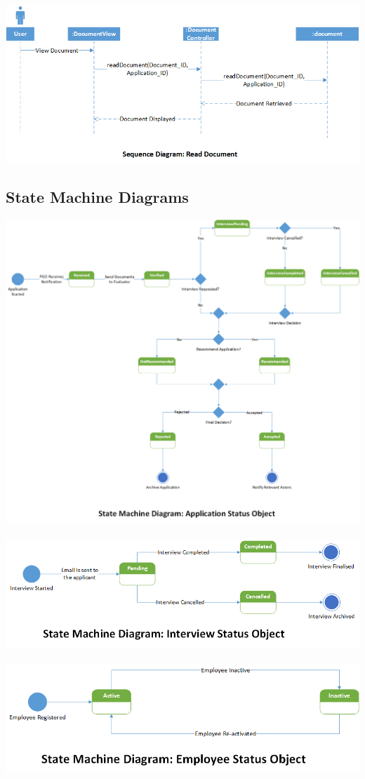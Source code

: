 \documentclass{article}
\begin{document}
\includegraphics[scale=0.7]{ReadDocumentSD.png} 
\subsection{State Machine Diagrams}
\includegraphics[scale=0.5]{ApplicationSMD.png} \\ \\
\includegraphics[scale=0.7]{InterviewSMD.png} \\ \\
\includegraphics[scale=0.75]{EmployeeSMD.png}
\end{document}

